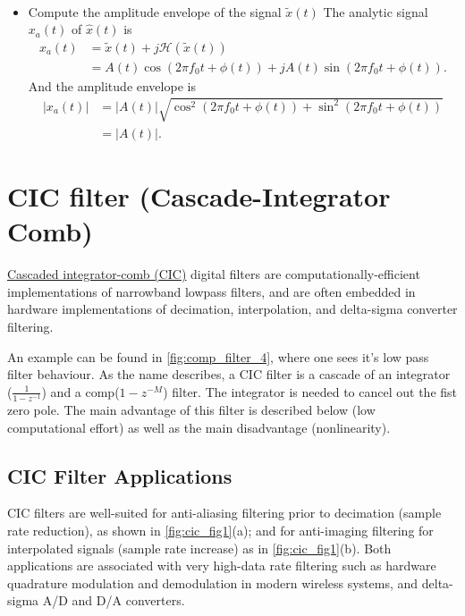\begin{itemize}
\begin{equation}
\begin{aligned}
    \end{aligned}
\end{equation}
    \item Compute the amplitude envelope of the signal $\tilde{x}(t)$\newline
    The analytic signal $x_a(t)$ of $\hat{x}(t)$ is
    $$
    \begin{aligned}
    x_a(t) & =\tilde{x}(t)+j \mathcal{H}(\tilde{x}(t)) \\
    & =A(t) \cos \left(2 \pi f_0 t+\phi(t)\right)+j A(t) \sin \left(2 \pi f_0 t+\phi(t)\right) .
    \end{aligned}
    $$
    And the amplitude envelope is
    $$
    \begin{aligned}
    \left|x_a(t)\right| & =|A(t)| \sqrt{\cos ^2\left(2 \pi f_0 t+\phi(t)\right)+\sin ^2\left(2 \pi f_0 t+\phi(t)\right)} \\
    & =|A(t)| .
    \end{aligned}
    $$
\end{itemize}
\section{CIC filter (Cascade-Integrator Comb)}
\href{https://www.dsprelated.com/showarticle/1337.php}{Cascaded integrator-comb (CIC)} digital filters are computationally-efficient implementations of narrowband lowpass filters, and are often embedded in hardware implementations of decimation, interpolation, and delta-sigma converter filtering. 

An example can be found in \autoref{fig:comp_filter_4}, where one sees it's low pass filter behaviour. As the name describes, a CIC filter is a cascade of an integrator ($\frac{1}{1-z^{-1}}$) and a comp($1-z^{-M}$) filter. The integrator is needed to cancel out the fist zero pole. The main advantage of this filter is described below (low computational effort) as well as the main disadvantage (nonlinearity).
\subsection{CIC Filter Applications}
CIC filters are well-suited for anti-aliasing filtering prior to decimation (sample rate reduction), as shown in \autoref{fig:cic_fig1}(a); and for anti-imaging filtering for interpolated signals (sample rate increase) as in \autoref{fig:cic_fig1}(b). Both applications are associated with very high-data rate filtering such as hardware quadrature modulation and demodulation in modern wireless systems, and delta-sigma A/D and D/A converters. 


